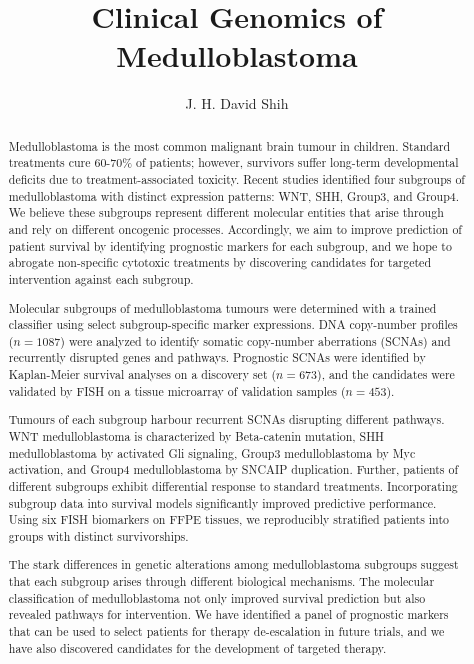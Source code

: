 \documentclass[12pt]{ut-thesis}
\author{J. H. David Shih}
\title{\textbf{Clinical Genomics of Medulloblastoma}}
\begin{document}
\begin{preliminary}

\maketitle

\cleardoublepage

\begin{abstract}
Medulloblastoma is the most common malignant brain tumour in children. Standard treatments cure 60-70\% of patients; however, survivors suffer long-term developmental deficits due to treatment-associated toxicity. Recent studies identified four subgroups of medulloblastoma with distinct expression patterns: WNT, SHH, Group3, and Group4. We believe these subgroups represent different molecular entities that arise through and rely on different oncogenic processes. Accordingly, we aim to improve prediction of patient survival by identifying prognostic markers for each subgroup, and we hope to abrogate non-specific cytotoxic treatments by discovering candidates for targeted intervention against each subgroup.

Molecular subgroups of medulloblastoma tumours were determined with a trained classifier using select subgroup-specific marker expressions. DNA copy-number profiles ($n=1087$) were analyzed to identify somatic copy-number aberrations (SCNAs) and recurrently disrupted genes and pathways. Prognostic SCNAs were identified by Kaplan-Meier survival analyses on a discovery set ($n=673$), and the candidates were validated by FISH on a tissue microarray of validation samples ($n=453$).

Tumours of each subgroup harbour recurrent SCNAs disrupting different pathways. WNT medulloblastoma is characterized by Beta-catenin mutation, SHH medulloblastoma by activated Gli signaling, Group3 medulloblastoma by Myc activation, and Group4 medulloblastoma by SNCAIP duplication. Further, patients of different subgroups exhibit differential response to standard treatments. Incorporating subgroup data into survival models significantly improved predictive performance. Using six FISH biomarkers on FFPE tissues, we reproducibly stratified patients into groups with distinct survivorships.

The stark differences in genetic alterations among medulloblastoma subgroups suggest that each subgroup arises through different biological mechanisms. The molecular classification of medulloblastoma not only improved survival prediction but also revealed pathways for intervention. We have identified a panel of prognostic markers that can be used to select patients for therapy de-escalation in future trials, and we have also discovered candidates for the development of targeted therapy.    
\end{abstract}


\end{preliminary}
\end{document}
